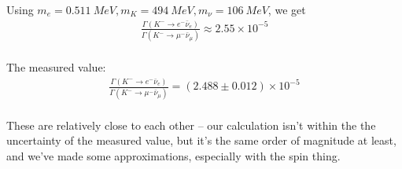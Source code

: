 Using $m_e = \SI{0.511}{MeV}, m_K = \SI{494}{MeV}, m_\nu = \SI{106}{MeV}$, we get
\begin{align*}
    \frac{\Gamma(K^- \to e^- \bar{\nu}_e)}{\Gamma(K^- \to \mu^- \bar{\nu}_\mu)} \approx 2.55 \times 10^{-5}\\
\end{align*}

The measured value:
\begin{align*}
    \frac{\Gamma(K^- \to e^- \bar{\nu}_e)}{\Gamma(K^- \to \mu^- \bar{\nu}_\mu)} = (2.488\pm 0.012) \times 10^{-5}\\
\end{align*}

These are relatively close to each other -- our calculation isn't within the the uncertainty of the measured value, but it's the same order of magnitude at least, and we've made some approximations, especially with the spin thing.
